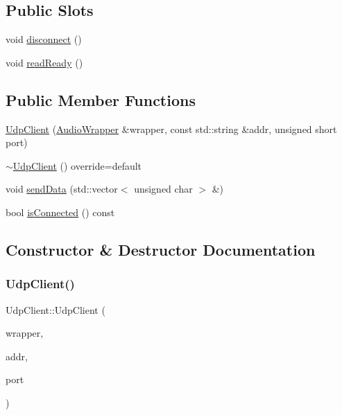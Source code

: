 \subsection*{Public Slots}
\begin{DoxyCompactItemize}
\item 
void \mbox{\hyperlink{classUdpClient_afb9c40847f84cb815a7b08b3cdc4e439}{disconnect}} ()
\item 
void \mbox{\hyperlink{classUdpClient_af7623324af1cdbae8097e944ac97f948}{read\+Ready}} ()
\end{DoxyCompactItemize}
\subsection*{Public Member Functions}
\begin{DoxyCompactItemize}
\item 
\mbox{\hyperlink{classUdpClient_a54bd1d949440939b259e371abcbd0979}{Udp\+Client}} (\mbox{\hyperlink{classAudioWrapper}{Audio\+Wrapper}} \&wrapper, const std\+::string \&addr, unsigned short port)
\item 
\mbox{\hyperlink{classUdpClient_af78eb7b234ce446e650515ef63f30540}{$\sim$\+Udp\+Client}} () override=default
\item 
void \mbox{\hyperlink{classUdpClient_a3fb3b0467e3ee8dda9609c3252e57d41}{send\+Data}} (std\+::vector$<$ unsigned char $>$ \&)
\item 
bool \mbox{\hyperlink{classUdpClient_a71661ffa50fe320926ae44978c2c2966}{is\+Connected}} () const
\end{DoxyCompactItemize}


\subsection{Constructor \& Destructor Documentation}
\mbox{\label{classUdpClient_a54bd1d949440939b259e371abcbd0979}} 
\subsubsection{\texorpdfstring{Udp\+Client()}{UdpClient()}}
{\footnotesize\ttfamily Udp\+Client\+::\+Udp\+Client (\begin{DoxyParamCaption}\item[{\mbox{\hyperlink{classAudioWrapper}{Audio\+Wrapper}} \&}]{wrapper,  }\item[{const std\+::string \&}]{addr,  }\item[{unsigned short}]{port }\end{DoxyParamCaption})}

